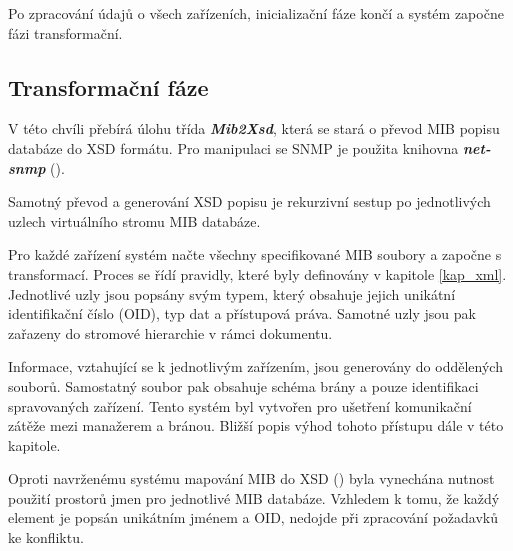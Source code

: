 Po zpracování údajů o všech zařízeních, inicializační fáze končí a systém započne fázi transformační.

\subsection{Transformační fáze}
V této chvíli přebírá úlohu třída \textit{\textbf{Mib2Xsd}}, která se stará o převod MIB popisu databáze do XSD formátu. Pro manipulaci se SNMP je
použita knihovna \textit{\textbf{net-snmp}} (\cite{net_snmp}).

Samotný převod a generování XSD popisu je rekurzivní sestup po jednotlivých uzlech virtuálního stromu MIB databáze.

Pro každé zařízení systém načte všechny specifikované MIB soubory a započne s transformací. Proces se řídí pravidly, které byly definovány v kapitole \ref{kap_xml}.
Jednotlivé uzly jsou popsány svým typem, který obsahuje jejich unikátní identifikační číslo (OID), typ dat a přístupová práva. Samotné uzly jsou pak zařazeny
do stromové hierarchie v rámci dokumentu.

Informace, vztahující se k jednotlivým zařízením, jsou generovány do oddělených souborů. Samostatný soubor
pak obsahuje schéma brány a pouze identifikaci spravovaných zařízení. Tento systém byl vytvořen pro ušetření komunikační zátěže mezi manažerem a bránou.
Bližší popis výhod tohoto přístupu dále v této kapitole.

Oproti navrženému systému mapování MIB do XSD (\cite{macejko_dipl}) byla vynechána nutnost použití prostorů jmen pro jednotlivé MIB databáze. Vzhledem
k tomu, že každý element je popsán unikátním jménem a OID, nedojde při zpracování požadavků ke konfliktu.

